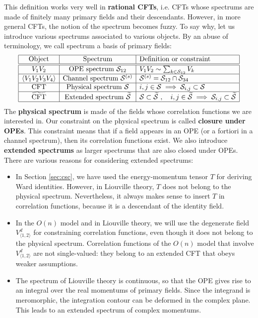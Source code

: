 \documentclass[12pt, a4paper]{article}
\theoremstyle{break}
\begin{document}
This definition works very well in \textbf{rational CFTs}, i.e. CFTs whose spectrums are made of finitely many primary fields and their descendants. However, in more general CFTs, the notion of the spectrum becomes fuzzy. To say why, let us introduce various spectrums associated to various objects. By an abuse of terminology, we call spectrum a basis of primary fields: 
\begin{align}
 \begin{array}{|c|c|l|}
  \hline 
  \text{Object} & \text{Spectrum}  & \text{Definition or constraint}
  \\
  \hline \hline 
  V_1V_2 & \text{OPE spectrum } \mathcal{S}_{12} & V_1V_2 \sim \sum_{k\in \mathcal{S}_{12}} V_k 
  \\
  \hline 
  \left<V_1V_2V_3V_4\right> & \text{Channel spectrum } \mathcal{S}^{(s)} &  \mathcal{S}^{(s)}= \mathcal{S}_{12}\cap \mathcal{S}_{34}
  \\
  \hline 
  \text{CFT} & \text{Physical spectrum } \mathcal{S} &  i,j\in\mathcal{S}\implies \mathcal{S}_{i,j}\subset \mathcal{S}  
  \\
  \hline 
  \widetilde{\text{CFT}} & \text{Extended spectrum } \widetilde{\mathcal{S}} & \mathcal{S}\subset \widetilde{\mathcal{S}}\ , \quad i,j\in\widetilde{\mathcal{S}}\implies \mathcal{S}_{i,j}\subset \widetilde{\mathcal{S}}
  \\
  \hline 
 \end{array}
 \label{specs}
\end{align}
The \textbf{physical spectrum} is made of the fields whose correlation functions we are interested in. Our constraint on the physical spectrum is called \textbf{closure under OPEs}. This constraint means that if a field appears in an OPE (or a fortiori in a channel spectrum), then its correlation functions exist. 
We also introduce \textbf{extended spectrums} as larger spectrums that are also closed under OPEs. There are various reasons for considering extended spectrums:
\begin{itemize}
 \item In Section \ref{sec:csc}, we have used the energy-momentum tensor $T$ for deriving Ward identities. However, in Liouville theory, $T$ does not belong to the physical spectrum. Nevertheless, it always makes sense to insert $T$ in correlation functions, because it is a descendant of the identity field. 
 \item In the $O(n)$ model and in Liouville theory, we will use the degenerate field $V^d_{\langle 1,2\rangle}$ for constraining correlation functions, even though it does not belong to the physical spectrum. Correlation functions of the $O(n)$ model that involve $V^d_{\langle 1,2\rangle}$ are not single-valued: they belong to an extended CFT that obeys weaker assumptions. 
 \item The spectrum of Liouville theory is continuous, so that the OPE gives rise to an integral over the real momentums of primary fields. Since the integrand is meromorphic, the integration contour can be deformed in the complex plane. This leads to an extended spectrum of complex momentums. 
\end{itemize}
\end{document}
